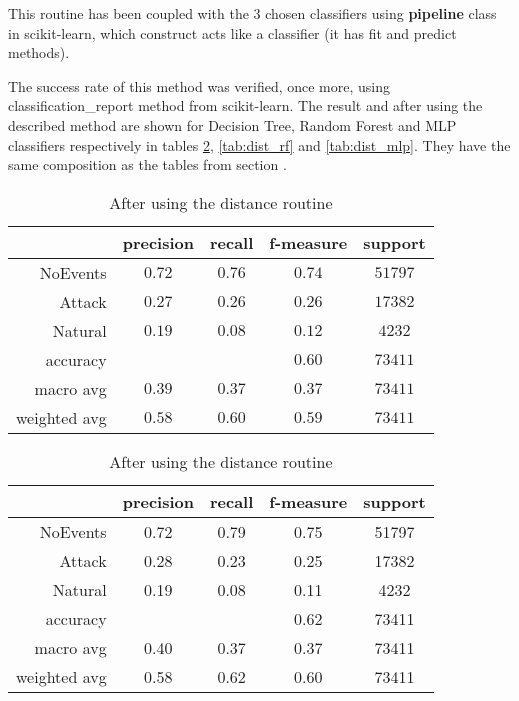 This routine has been coupled with the 3 chosen classifiers using \textbf{pipeline} class in scikit-learn, which construct acts like a classifier (it has fit and predict methods). 

The success rate of this method was verified, once more, using classification\_report method from scikit-learn. The result and after using the described method are shown for Decision Tree, Random Forest and MLP classifiers respectively in tables \ref{tab:dist_dt}, \ref{tab:dist_rf} and \ref{tab:dist_mlp}. They have the same composition as the tables from section \label{sec:metrics}.

\begin{table}[H]
    \centering \footnotesize
    \caption{Distance routine results for Decision Tree classifier}  \label{tab:dist_dt}
    \begin{subtable}[t]{.5\linewidth}
        \centering
        \caption{Before using the distance routine} 
        \begin{tabular}{rcccc}\toprule
            & precision    &recall & f-measure  & support \\\midrule
                NoEvents  &   $  0.72 $  &  $ 0.76 $  &  $ 0.74 $  & $ 51797 $\\
                  Attack   &  $  0.27 $   & $ 0.26 $  &  $ 0.26 $  & $ 17382 $\\
                 Natural   &  $  0.19 $   & $ 0.08 $  &  $ 0.12 $  & $  4232 $\\
                accuracy   &            &          &  $0.60$  &   $73411$ \\
               macro avg   &  $  0.39 $   & $ 0.37 $  &  $ 0.37 $  & $ 73411 $\\
            weighted avg   &  $  0.58 $  &  $ 0.60 $  &  $ 0.59 $ &  $ 73411 $\\\bottomrule
        \end{tabular}
    \end{subtable}%
    \begin{subtable}[t]{.5\linewidth}
        \centering
        \caption{After using the distance routine} 
        \begin{tabular}{rcccc}\toprule
         &   precision    &recall & f-measure &  support  \\\midrule
    
            NoEvents    &   0.72   &   0.79   &   0.75  &   51797 \\
              Attack    &   0.28   &   0.23   &   0.25  &   17382 \\
             Natural   &    0.19   &   0.08   &   0.11  &    4232 \\
        
            accuracy    &           &         &   0.62   &  73411 \\
           macro avg    &   0.40    &  0.37   &   0.37  &   73411 \\
        weighted avg   &   0.58   &   0.62   &   0.60   &  73411   \\  \bottomrule
        \end{tabular}
    \end{subtable}
\end{table}

